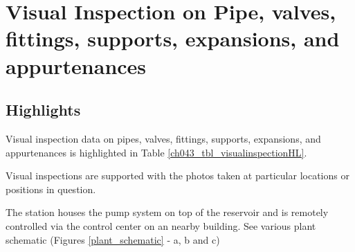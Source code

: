 \section{Visual Inspection on Pipe, valves, fittings, supports, expansions, and appurtenances}
\label{ch04mech02}

\subsection{Highlights}
\label{ch04mech02_highlight}

Visual inspection data on pipes, valves, fittings, supports, expansions, and appurtenances is highlighted in Table \ref{ch043_tbl_visualinspectionHL}.



Visual inspections are supported with the photos taken at particular locations or positions in question.

The station houses the pump system on top of the reservoir and is remotely controlled via the control center on an nearby building. See various plant schematic (Figures \ref {plant_schematic} - a, b and c)

